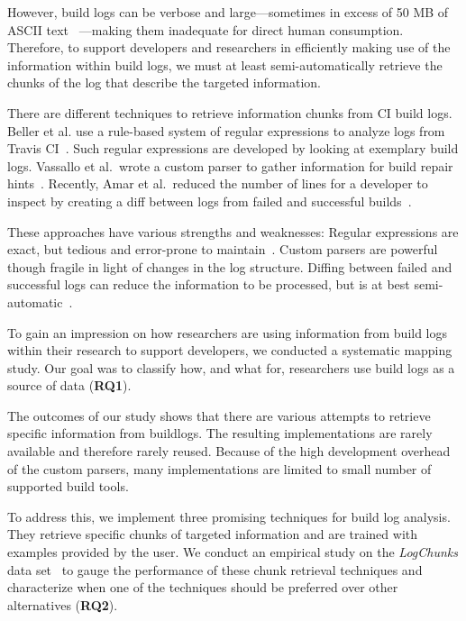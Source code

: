 However, build logs can be verbose and large---sometimes in excess of
50 MB of ASCII text ~\cite{beller2017oops}---making them inadequate
for direct human consumption.
Therefore, to support developers and
researchers in efficiently making use of the information within build
logs, we must at least semi-automatically retrieve the chunks of the
log that describe the targeted information.

There are different techniques to retrieve information chunks from CI
build logs.
Beller et al.
use a rule-based system of regular
expressions to analyze logs from Travis CI~\cite{beller2017oops}.
Such regular expressions are developed by looking at exemplary build
logs.
Vassallo et al.\ wrote a custom parser to gather information
for build repair hints~\cite{vassallo2018un-break}.
Recently, Amar et
al.\ reduced the number of lines for a developer to inspect by
creating a diff between logs from failed and successful
builds~\cite{amar2019mining}.

These approaches have various strengths and weaknesses: Regular
expressions are exact, but tedious and error-prone to
maintain~\cite{michael2019regexes}.
Custom parsers are powerful
though fragile in light of changes in the log structure.
Diffing
between failed and successful logs can reduce the information to be
processed, but is at best semi-automatic~\cite{amar2019mining}.

To gain an impression on how researchers are using information from
build logs within their research to support
developers, we conducted a systematic mapping study.
Our goal was to classify how, and what for, researchers use build logs as
a source of data (\textbf{RQ1}).

The outcomes of our study shows that there are various attempts to
retrieve specific information from buildlogs.
The resulting implementations are rarely available and therefore rarely reused.
Because of the high development overhead
of the custom parsers, many implementations are limited to small number
of supported build tools.

To address this, we implement three promising techniques for build
log analysis.
They retrieve specific chunks of targeted information and are trained
with examples provided by the user.
We conduct an empirical study on the \emph{LogChunks} data
set~\cite{brandt2020logchunks} to
gauge the performance of these chunk retrieval techniques and characterize
when one of the techniques should be preferred over other alternatives
(\textbf{RQ2}).

